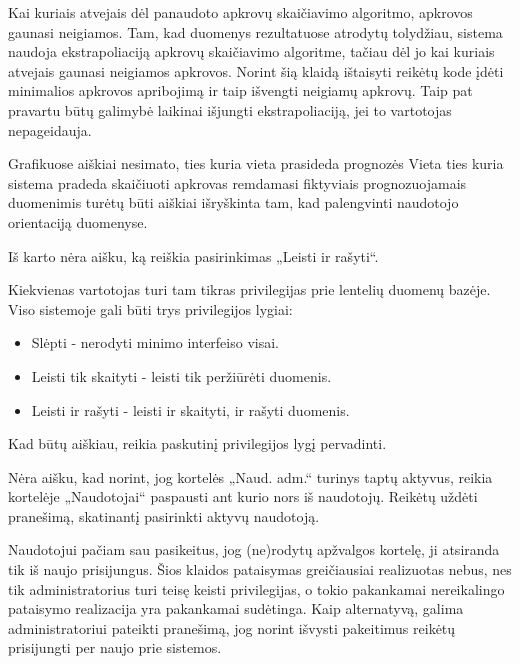 {
  Kai kuriais atvejais dėl panaudoto apkrovų skaičiavimo algoritmo,
  apkrovos gaunasi neigiamos.
}
{
  Tam, kad duomenys rezultatuose atrodytų tolydžiau, sistema naudoja ekstrapoliaciją
  apkrovų skaičiavimo algoritme, tačiau dėl jo kai kuriais atvejais gaunasi neigiamos
  apkrovos. Norint šią klaidą ištaisyti reikėtų kode įdėti minimalios apkrovos apribojimą ir
  taip išvengti neigiamų apkrovų. Taip pat pravartu būtų galimybė laikinai išjungti
  ekstrapoliaciją, jei to vartotojas nepageidauja.
}

{
  Grafikuose aiškiai nesimato, ties kuria vieta prasideda prognozės
}
{
  Vieta ties kuria sistema pradeda skaičiuoti apkrovas remdamasi fiktyviais prognozuojamais
  duomenimis turėtų būti aiškiai išryškinta tam, kad palengvinti naudotojo orientaciją
  duomenyse.
}

{
  Iš karto nėra aišku, ką reiškia pasirinkimas „Leisti ir rašyti“.
}
{
  Kiekvienas vartotojas turi tam tikras privilegijas prie lentelių duomenų bazėje. Viso 
  sistemoje gali būti trys privilegijos lygiai:
  \begin{itemize}
    \item Slėpti - nerodyti minimo interfeiso visai.
    \item Leisti tik skaityti - leisti tik peržiūrėti duomenis.
    \item Leisti ir rašyti - leisti ir skaityti, ir rašyti duomenis.
  \end{itemize}
  Kad būtų aiškiau, reikia paskutinį privilegijos lygį pervadinti.
}

{
  Nėra aišku, kad norint, jog kortelės „Naud. adm.“ turinys taptų aktyvus,
  reikia kortelėje „Naudotojai“ paspausti ant kurio nors iš naudotojų.
}
{
  Reikėtų uždėti pranešimą, skatinantį pasirinkti aktyvų naudotoją.
}

{
  Naudotojui pačiam sau pasikeitus, jog (ne)rodytų apžvalgos kortelę, ji
  atsiranda tik iš naujo prisijungus.
}
{
  Šios klaidos pataisymas greičiausiai realizuotas nebus, nes tik administratorius
  turi teisę keisti privilegijas, o tokio pakankamai nereikalingo pataisymo realizacija
  yra pakankamai sudėtinga. Kaip alternatyvą, galima administratoriui pateikti pranešimą,
  jog norint išvysti pakeitimus reikėtų prisijungti per naujo prie sistemos.
}

